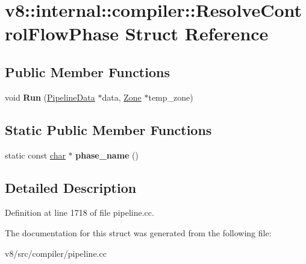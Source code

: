 \hypertarget{structv8_1_1internal_1_1compiler_1_1ResolveControlFlowPhase}{}\section{v8\+:\+:internal\+:\+:compiler\+:\+:Resolve\+Control\+Flow\+Phase Struct Reference}
\label{structv8_1_1internal_1_1compiler_1_1ResolveControlFlowPhase}
\subsection*{Public Member Functions}
\begin{DoxyCompactItemize}
\item 
\mbox{\label{structv8_1_1internal_1_1compiler_1_1ResolveControlFlowPhase_a764168fafa6d8140b197cc149b2ff5f5}} 
void {\bfseries Run} (\mbox{\hyperlink{classv8_1_1internal_1_1compiler_1_1PipelineData}{Pipeline\+Data}} $\ast$data, \mbox{\hyperlink{classv8_1_1internal_1_1Zone}{Zone}} $\ast$temp\+\_\+zone)
\end{DoxyCompactItemize}
\subsection*{Static Public Member Functions}
\begin{DoxyCompactItemize}
\item 
\mbox{\label{structv8_1_1internal_1_1compiler_1_1ResolveControlFlowPhase_a07eebe867df1611a42b7b3fef49ed5bd}} 
static const \mbox{\hyperlink{classchar}{char}} $\ast$ {\bfseries phase\+\_\+name} ()
\end{DoxyCompactItemize}


\subsection{Detailed Description}


Definition at line 1718 of file pipeline.\+cc.



The documentation for this struct was generated from the following file\+:\begin{DoxyCompactItemize}
\item 
v8/src/compiler/pipeline.\+cc\end{DoxyCompactItemize}
